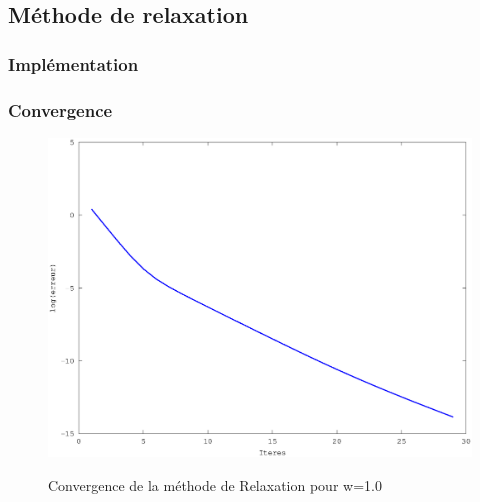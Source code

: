 \documentclass[a4paper,11pt]{article}
\begin{document}
\subsection{Méthode de relaxation}
\subsubsection{Implémentation}
\begin{multicols}{2}
  
\end{multicols}

\subsubsection{Convergence}
\begin{figure}[h!]
  \begin{centering}
    \includegraphics[scale=0.5]{../relaxation_graph}
    \label{rspro2}
    \par\end{centering}
  \caption{Convergence de la méthode de Relaxation pour w=1.0}
  \label{fig:jacobi-conv}
\end{figure}
\end{document}

